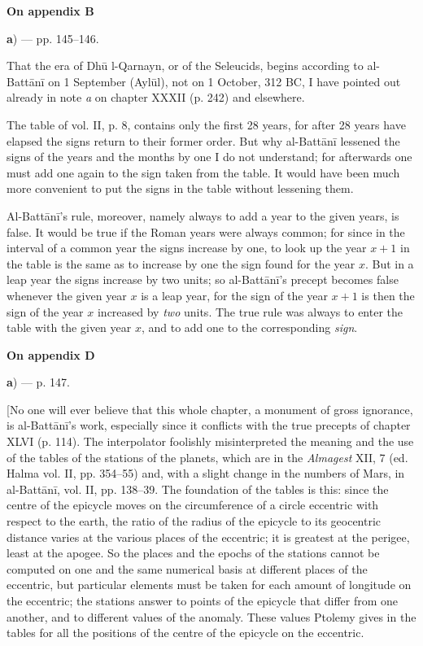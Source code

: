 \documentclass[11pt]{article}
\newcommand{\Pg}[1]{\marginpar{\footnotesize\color{gray}#1}}
\newcommand{\UnitHead}[2]{\par\setcounter{footnoteT}{0}\needspace{8\baselineskip}\bigskip\pdfbookmark[1]{#1}{unit-#2}\hypertarget{EN-#2}{}%
 {\large\bfseries\interlinepenalty=10000 #1\par}\nobreak\medskip}
\begin{document}
\UnitHead{On appendix B}{AB}
\par\begin{center}\textbf{a}) — pp. 145–146.\end{center}
\par That the era of Dhū l-Qarnayn, or of the Seleucids, begins according to al-Battānī on 1 September (Aylūl), not on 1 October, 312 BC, I have pointed out already in note \emph{a} on chapter XXXII (p. 242) and elsewhere.\par
\par The table of vol. II, p. 8, contains only the first 28 years, for after 28 years have elapsed the signs return to their former order. But why al-Battānī lessened the signs of the years and the months by one I do not understand; for afterwards one must add one again to the sign taken from the table. It would have been much more convenient to put the signs in the table without lessening them.\par
\par Al-Battānī's rule, moreover, namely always to add a year to the given years, is false. It would be true if the Roman years were always common; for since in the interval of a common year the signs increase by one, to look up the year $x + 1$ in the table is the same as to increase by one the sign found for the year $x$. But in a leap year the signs increase by two units; so al-Battānī's precept becomes false whenever the given year $x$ is a leap year, for the sign of the year $x + 1$ is then the sign of the year $x$ increased by \emph{two} units. The true rule was always to enter the table with the given year $x$, and to add one to the corresponding \emph{sign}.\par
\UnitHead{On appendix D}{AD}\Pg{I 324}
\par\begin{center}\textbf{a}) — p. 147.\end{center}
\par [No one will ever believe that this whole chapter, a monument of gross ignorance, is al-Battānī's work, especially since it conflicts with the true precepts of chapter XLVI (p. 114). The interpolator foolishly misinterpreted the meaning and the use of the tables of the stations of the planets, which are in the \emph{Almagest} XII, 7 (ed. Halma vol. II, pp. 354–55) and, with a slight change in the numbers of Mars, in al-Battānī, vol. II, pp. 138–39. The foundation of the tables is this: since the centre of the epicycle moves on the circumference of a circle eccentric with respect to the earth, the ratio of the radius of the epicycle to its geocentric distance varies at the various places of the eccentric; it is greatest at the perigee, least at the apogee. So the places and the epochs of the stations cannot be computed on one and the same numerical basis at different places of the eccentric, but particular elements must be taken for each amount of longitude on the eccentric; the stations answer to points of the epicycle that differ from one another, and to different values of the anomaly. These values Ptolemy gives in the tables for all the positions of the centre of the epicycle on the eccentric.\par
\end{document}
